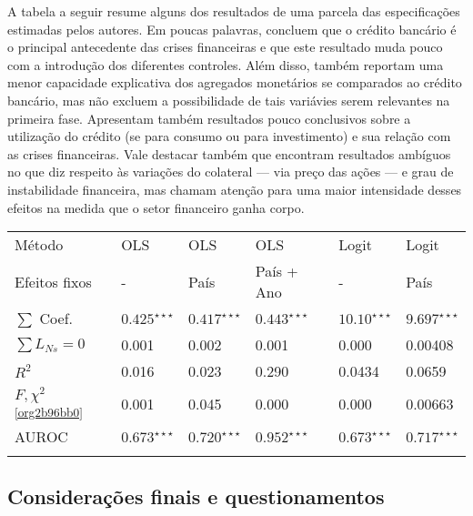 \documentclass[11pt]{article}
\begin{document}
A tabela a seguir resume alguns dos resultados de uma parcela das especificações estimadas pelos autores.
Em poucas palavras, \textcite{schularickCreditBoomsGone2012} concluem que o crédito bancário é o principal antecedente das crises financeiras e que este resultado muda pouco com a introdução dos diferentes controles.
Além disso, também reportam uma menor capacidade explicativa dos agregados monetários se comparados ao crédito bancário, mas não excluem a possibilidade de tais variávies serem relevantes na primeira fase.
Apresentam também resultados pouco conclusivos sobre a utilização do crédito (se para consumo ou para investimento) e sua relação com as crises financeiras.
Vale destacar também que encontram resultados ambíguos no que diz respeito às variações do colateral --- via preço das ações --- e grau de instabilidade financeira, mas chamam atenção para uma maior intensidade desses efeitos na medida que o setor financeiro ganha corpo.

\begin{center}
\begin{center}
\begin{tabular}{llllll}
\hline
Método & OLS & OLS & OLS & Logit & Logit\\
Efeitos fixos & - & País & País + Ano & - & País\\
\hline
\(\sum\) Coef. & \(0.425^{\star\star\star}\) & \(0.417^{\star\star\star}\) & \(0.443^{\star\star\star}\) & \(10.10^{\star\star\star}\) & \(9.697^{\star\star\star}\)\\
\(\sum L_{Ns} = 0\)\footnotemark & 0.001 & 0.002 & 0.001 & 0.000 & 0.00408\\
\(R^2\) & 0.016 & 0.023 & 0.290 & 0.0434 & 0.0659\\
\(F, \chi^{2}\)\textsuperscript{\ref{org2b96bb0}} & 0.001 & 0.045 & 0.000 & 0.000 & 0.00663\\
AUROC & \(0.673^{\star\star\star}\) & \(0.720^{\star\star\star}\) & \(0.952^{\star\star\star}\) & \(0.673^{\star\star\star}\) & \(0.717^{\star\star\star}\)\\
\hline
 &  &  &  &  & \\
\end{tabular}
\end{center}
\end{center}



\subsection*{Considerações finais e questionamentos}
\label{sec:orgc676eae}
\end{document}
